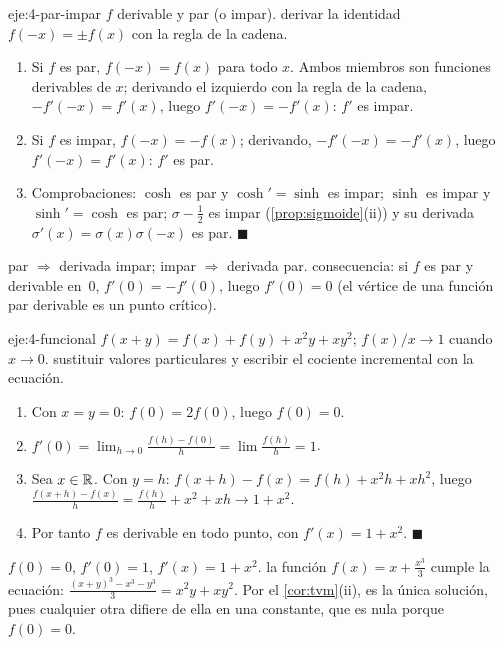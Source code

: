 \begin{solucion}{eje:4-par-impar}
\datos $f$ derivable y par (o impar).
\planteamiento derivar la identidad $f(-x)=\pm f(x)$ con la regla de la cadena.
\pasos
\begin{enumerate}[label=\arabic*.]
  \item Si $f$ es par, $f(-x)=f(x)$ para todo $x$. Ambos miembros son funciones derivables de $x$; derivando el izquierdo con la regla de la cadena, $-f'(-x)=f'(x)$, luego $f'(-x)=-f'(x)$: $f'$ es impar.
  \item Si $f$ es impar, $f(-x)=-f(x)$; derivando, $-f'(-x)=-f'(x)$, luego $f'(-x)=f'(x)$: $f'$ es par.
  \item Comprobaciones: $\cosh$ es par y $\cosh'=\sinh$ es impar; $\sinh$ es impar y $\sinh'=\cosh$ es par; $\sigma-\frac12$ es impar (\cref{prop:sigmoide}(ii)) y su derivada $\sigma'(x)=\sigma(x)\sigma(-x)$ es par. \hfill$\blacksquare$
\end{enumerate}
\resultado par $\Rightarrow$ derivada impar; impar $\Rightarrow$ derivada par.
\comprobacion consecuencia: si $f$ es par y derivable en~0, $f'(0)=-f'(0)$, luego $f'(0)=0$ (el vértice de una función par derivable es un punto crítico).
\end{solucion}

\begin{solucion}{eje:4-funcional}
\datos $f(x+y)=f(x)+f(y)+x^{2}y+xy^{2}$; $f(x)/x\to1$ cuando $x\to0$.
\planteamiento sustituir valores particulares y escribir el cociente incremental con la ecuación.
\pasos
\begin{enumerate}[label=\arabic*.]
  \item Con $x=y=0$: $f(0)=2f(0)$, luego $f(0)=0$.
  \item $f'(0)=\lim_{h\to0}\frac{f(h)-f(0)}{h}=\lim\frac{f(h)}{h}=1$.
  \item Sea $x\in\mathbb{R}$. Con $y=h$: $f(x+h)-f(x)=f(h)+x^{2}h+xh^{2}$, luego $\frac{f(x+h)-f(x)}{h}=\frac{f(h)}{h}+x^{2}+xh\to1+x^{2}$.
  \item Por tanto $f$ es derivable en todo punto, con $f'(x)=1+x^{2}$. \hfill$\blacksquare$
\end{enumerate}
\resultado $f(0)=0$, $f'(0)=1$, $f'(x)=1+x^{2}$.
\comprobacion la función $f(x)=x+\frac{x^{3}}{3}$ cumple la ecuación: $\frac{(x+y)^{3}-x^{3}-y^{3}}{3}=x^{2}y+xy^{2}$. Por el \cref{cor:tvm}(ii), es la única solución, pues cualquier otra difiere de ella en una constante, que es nula porque $f(0)=0$.
\end{solucion}

